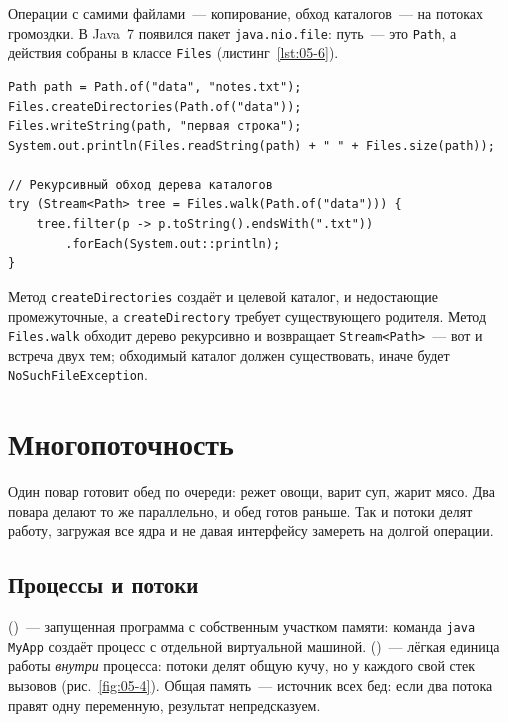 Операции с самими файлами~--- копирование, обход каталогов~--- на потоках
громоздки. В Java~7 появился пакет \texttt{java.nio.file}: путь~--- это
\texttt{Path}, а действия собраны в классе \texttt{Files}
(листинг~\ref{lst:05-6}).

\begin{listing}[H]
\begin{verbatim}
Path path = Path.of("data", "notes.txt");
Files.createDirectories(Path.of("data"));
Files.writeString(path, "первая строка");
System.out.println(Files.readString(path) + " " + Files.size(path));

// Рекурсивный обход дерева каталогов
try (Stream<Path> tree = Files.walk(Path.of("data"))) {
    tree.filter(p -> p.toString().endsWith(".txt"))
        .forEach(System.out::println);
}
\end{verbatim}
\caption{Операции с файлами и каталогами через NIO.2}
\label{lst:05-6}
\end{listing}

Метод \texttt{createDirectories} создаёт и целевой каталог, и недостающие
промежуточные, а \texttt{createDirectory} требует существующего родителя. Метод
\texttt{Files.walk} обходит дерево рекурсивно и возвращает
\texttt{Stream<Path>}~--- вот и встреча двух тем; обходимый каталог должен
существовать, иначе будет \texttt{NoSuchFileException}.

\section{Многопоточность}

Один повар готовит обед по очереди: режет овощи, варит суп, жарит мясо. Два
повара делают то же параллельно, и обед готов раньше. Так и потоки делят работу,
загружая все ядра и не давая интерфейсу замереть на долгой операции.

\subsection{Процессы и потоки}

 ()~--- запущенная программа с собственным участком
памяти: команда \texttt{java MyApp} создаёт процесс с отдельной виртуальной
машиной.  ()~--- лёгкая единица работы \emph{внутри}
процесса: потоки делят общую кучу, но у каждого свой стек вызовов
(рис.~\ref{fig:05-4}). Общая память~--- источник всех бед: если два потока
правят одну переменную, результат непредсказуем.


